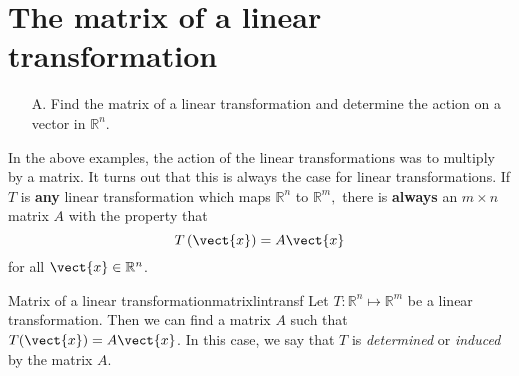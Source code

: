 \section{The matrix of a linear \texorpdfstring{\\}{ } transformation}

\begin{outcome}
\begin{enumerate}
\item[A.]  Find the matrix of a linear transformation and determine the action on a vector in $\mathbb{R}^n$.   
\end{enumerate}
\end{outcome}

In the above examples, the action of the linear transformations was to multiply by a matrix. 
It turns out that this is always the case for linear transformations.
If $T$ is \textbf{any} linear transformation which maps $\mathbb{R}^{n}$ to 
$\mathbb{R}^{m},$ there is \textbf{always} an $m\times n$ matrix $A$ with the
property that
\begin{equation}
T\left(\vect{x}\right) = A\vect{x} \label{matrixoftransf}
\end{equation}
for all $\vect{x} \in \mathbb{R}^{n}$.

\begin{theorem}{Matrix of a linear transformation}{matrixlintransf}
Let $T:\mathbb{R}^{n}\mapsto \mathbb{R}^{m}$ be a linear transformation. Then we can find a matrix $A$ such that $T(\vect{x}) = A\vect{x}$. 
 In this case, we say that $T$ is {\em determined\em} or {\em induced\em}
by the matrix $A$.
\end{theorem}

